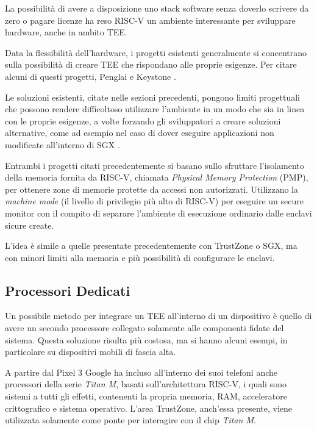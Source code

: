 \documentclass[12pt,italian]{report}
\begin{document}
	La possibilità di avere a disposizione uno stack software senza doverlo scrivere da zero o pagare licenze ha reso RISC-V un ambiente interessante per sviluppare hardware, anche in ambito TEE.
	
	\bigbreak
	
	Data la flessibilità dell'hardware, i progetti esistenti generalmente si concentrano sulla possibilità di creare TEE che rispondano alle proprie esigenze. Per citare alcuni di questi progetti, Penglai \cite{penglai} e Keystone \cite{keystone}. 
	
	Le soluzioni esistenti, citate nelle sezioni precedenti, pongono limiti progettuali che possono rendere difficoltoso utilizzare l'ambiente in un modo che sia in linea con le proprie esigenze, a volte forzando gli sviluppatori a creare soluzioni alternative, come ad esempio nel caso di dover eseguire applicazioni non modificate all'interno di SGX \cite{grapheneSGX}.
	
	Entrambi i progetti citati precedentemente si basano sullo sfruttare l'isolamento della memoria fornita da RISC-V, chiamata \textit{Physical Memory Protection} (PMP), per ottenere zone di memorie protette da accessi non autorizzati. Utilizzano la \textit{machine mode} (il livello di privilegio più alto di RISC-V) per eseguire un secure monitor con il compito di separare l'ambiente di esecuzione ordinario dalle enclavi sicure create.
	
	L'idea è simile a quelle presentate precedentemente con TrustZone o SGX, ma con minori limiti alla memoria e più possibilità di configurare le enclavi.
	
	\subsection{Processori Dedicati}
	\label{subsec:altri-rpc}
	Un possibile metodo per integrare un TEE all'interno di un dispositivo è quello di avere un secondo processore collegato solamente alle componenti fidate del sistema. Questa soluzione risulta più costosa, ma si hanno alcuni esempi, in particolare su dispositivi mobili di fascia alta.
	
	\bigbreak
	
	A partire dal Pixel 3 Google ha incluso all'interno dei suoi telefoni anche processori della serie \textit{Titan M}, basati sull'architettura RISC-V, i quali sono sistemi a tutti gli effetti, contenenti la propria memoria, RAM, acceleratore crittografico e sistema operativo. L'area TrustZone, anch'essa presente, viene utilizzata solamente come ponte per interagire con il chip \textit{Titan M}.
	
\end{document}
